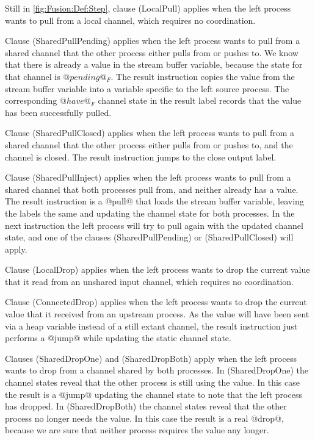Still in \cref{fig:Fusion:Def:Step}, clause (LocalPull) applies when the left process wants to pull from a local channel, which requires no coordination.

Clause (SharedPullPending) applies when the left process wants to pull from a shared channel that the other process either pulls from or pushes to.
We know that there is already a value in the stream buffer variable, because the state for that channel is $@pending@_F$.
The result instruction copies the value from the stream buffer variable into a variable specific to the left source process.
The corresponding $@have@_F$ channel state in the result label records that the value has been successfully pulled.

Clause (SharedPullClosed) applies when the left process wants to pull from a shared channel that the other process either pulls from or pushes to, and the channel is closed.
The result instruction jumps to the close output label.

Clause (SharedPullInject) applies when the left process wants to pull from a shared channel that both processes pull from, and neither already has a value.
The result instruction is a @pull@ that loads the stream buffer variable, leaving the labels the same and updating the channel state for both processes.
In the next instruction the left process will try to pull again with the updated channel state, and one of the clauses (SharedPullPending) or (SharedPullClosed) will apply.

Clause (LocalDrop) applies when the left process wants to drop the current value that it read from an unshared input channel, which requires no coordination.

Clause (ConnectedDrop) applies when the left process wants to drop the current value that it received from an upstream process. As the value will have been sent via a heap variable instead of a still extant channel, the result instruction just performs a @jump@ while updating the static channel state.

Clauses (SharedDropOne) and (SharedDropBoth) apply when the left process wants to drop from a channel shared by both processes. In (SharedDropOne) the channel states reveal that the other process is still using the value. In this case the result is a @jump@ updating the channel state to note that the left process has dropped. In (SharedDropBoth) the channel states reveal that the other process no longer needs the value. In this case the result is a real @drop@, because we are sure that neither process requires the value any longer.

